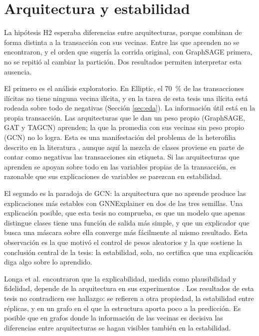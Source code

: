 \section{Arquitectura y estabilidad}\label{sec:dis_h2}

La hipótesis H2 esperaba diferencias entre arquitecturas, porque combinan de forma distinta a la
transacción con sus vecinas. Entre las que aprenden no se encontraron, y el orden que sugería la
corrida original, con GraphSAGE primera, no se repitió al cambiar la partición. Dos resultados
permiten interpretar esta ausencia.

El primero es el análisis exploratorio. En Elliptic, el 70~\% de las transacciones ilícitas no
tiene ninguna vecina ilícita, y en la tarea de esta tesis una ilícita está rodeada sobre todo de
negativas (Sección \ref{sec:eda}). La información útil está en la propia transacción. Las
arquitecturas que le dan un peso propio (GraphSAGE, GAT y TAGCN) aprenden; la que la promedia
con sus vecinas sin peso propio (GCN) no lo logra. Esta es una manifestación del problema de la
heterofilia descrito en la literatura \cite{Zheng2026Heterophily}, aunque aquí la mezcla de
clases proviene en parte de contar como negativas las transacciones sin etiqueta. Si las
arquitecturas que aprenden se apoyan sobre todo en las variables propias de la transacción, es
razonable que sus explicaciones de variables se parezcan en estabilidad.

El segundo es la paradoja de GCN: la arquitectura que no aprende produce las explicaciones más
estables con GNNExplainer en dos de las tres semillas. Una explicación posible, que esta tesis
no comprueba, es que un modelo que apenas distingue clases tiene una función de salida más
simple, y que un explicador que busca una máscara sobre ella converge más fácilmente al mismo
resultado. Esta observación es la que motivó el control de
pesos aleatorios y la que sostiene la conclusión central de la tesis: la estabilidad, sola, no
certifica que una explicación diga algo sobre lo aprendido.

Longa et al. encontraron que la explicabilidad, medida como plausibilidad y fidelidad, depende
de la arquitectura en sus experimentos \cite{Longa2024Explaining}. Los resultados de esta tesis
no contradicen ese hallazgo: se refieren a otra propiedad, la estabilidad entre réplicas, y en un grafo en el que la estructura aporta poco a la
predicción. Es posible que en grafos donde la información de las vecinas es decisiva las
diferencias entre arquitecturas se hagan visibles también en la estabilidad.

